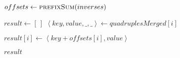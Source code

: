 \begin{frame}[containsverbatim]{\insertionseriessortmergefunctionframe}
\begin{algorithm}[H]
\begin{multicols}{2}
\begin{algorithmic}[1]
                                \State $offsets \gets \Call{prefixSum}{inverses}$
            
                                \State $result \gets \left[\ \right]$
                                    \State $\left<key, value, \_, \_\right> \gets quadruplesMerged{\left[i\right]}$
                                    
                                    \State $result{\left[i\right]} \gets \left<key + offsets{\left[i\right]}, value\right>$
                                \EndFor
                                
                                \State \Return $result$
                            \EndFunction
                        \end{algorithmic}
                    \end{multicols}
                \end{algorithm}
            \endgroup
        \end{frame}

